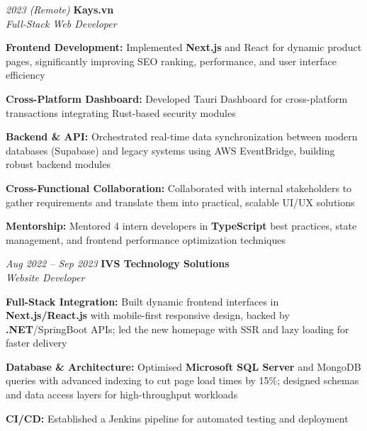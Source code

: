 \begin{twocolentry}{\textit{2023 (Remote)}}
    \textbf{Kays.vn} \\[4pt]
    \textit{Full-Stack Web Developer}
\end{twocolentry}
\begin{onecolentry}
    \begin{highlights}
        \item \textbf{Frontend Development:} Implemented \textbf{Next.js} and React for dynamic product pages, significantly improving SEO ranking, performance, and user interface efficiency
        \item \textbf{Cross-Platform Dashboard:} Developed Tauri Dashboard for cross-platform transactions integrating Rust-based security modules
        \item \textbf{Backend \& API:} Orchestrated real-time data synchronization between modern databases (Supabase) and legacy systems using AWS EventBridge, building robust backend modules
        \item \textbf{Cross-Functional Collaboration:} Collaborated with internal stakeholders to gather requirements and translate them into practical, scalable UI/UX solutions
        \item \textbf{Mentorship:} Mentored 4 intern developers in \textbf{TypeScript} best practices, state management, and frontend performance optimization techniques
    \end{highlights}
\end{onecolentry}
\vspace{0.2 cm}

\begin{twocolentry}{\textit{Aug 2022 -- Sep 2023}}
    \textbf{IVS Technology Solutions} \\[4pt]
    \textit{Website Developer}
\end{twocolentry}
\begin{onecolentry}
    \begin{highlights}
        \item \textbf{Full-Stack Integration:} Built dynamic frontend interfaces in \textbf{Next.js/React.js} with mobile-first responsive design, backed by \textbf{.NET}/SpringBoot APIs; led the new homepage with SSR and lazy loading for faster delivery
        \item \textbf{Database \& Architecture:} Optimised \textbf{Microsoft SQL Server} and MongoDB queries with advanced indexing to cut page load times by 15\%; designed schemas and data access layers for high-throughput workloads
        \item \textbf{CI/CD:} Established a Jenkins pipeline for automated testing and deployment
    \end{highlights}
\end{onecolentry}

